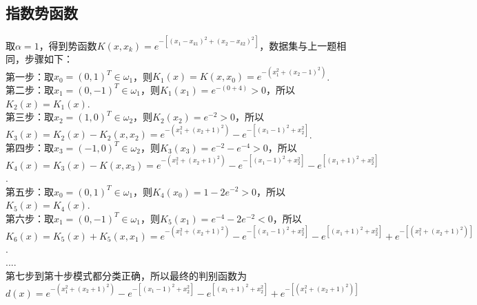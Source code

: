 \documentclass{article}
\begin{document}
\begin{CJK*}{UTF8}{gbsn}
    \section{指数势函数}
    取$\alpha=1$，得到势函数$K(x, x_{k})=e^{-[(x_{1}-x_{k1})^{2} + (x_{2}-x_{k2})^{2}]}$，数据集与上一题相同，步骤如下：\\
    第一步：取$x_{0}=(0, 1)^{T} \in \omega_{1}$，则$K_{1}(x) = K(x, x_{0}) = e^{-(x_{1}^{2}+(x_{2}-1)^2)}$. \\
    第二步：取$x_{1}=(0, -1)^{T} \in \omega_{1}$，则$K_{1}(x_{1})=e^{-(0+4)} > 0$，所以$K_{2}(x) = K_{1}(x)$. \\
    第三步：取$x_{2}=(1, 0)^{T} \in \omega_{2}$，则$K_{2}(x_{2})=e^{-2} > 0$，所以$K_{3}(x) = K_{2}(x) - K_{2}(x, x_{2}) = e^{-(x_{1}^{2}+(x_{2}+1)^{2})} - e^{-[(x_{1}-1)^{2}+x_{2}^{2}]}$. \\
    第四步：取$x_{3}=(-1, 0)^{T} \in \omega_{2}$，则$K_{3}(x_{3})=e^{-2}-e^{-4} > 0$，所以$K_{4}(x) = K_{3}(x)-K(x, x_{3}) = e^{-(x_{1}^{2}+(x_{2}+1)^{2})} - e^{-[(x_{1}-1)^{2}+x_{2}^{2}]} - e^{[(x_{1}+1)^{2}+x_{2}^{2}]}$. \\
    第五步：取$x_{0}=(0, 1)^{T} \in \omega_{1}$，则$K_{4}(x_{0}) = 1-2e^{-2} > 0$，所以$K_{5}(x) = K_{4}(x)$. \\
    第六步：取$x_{1}=(0, -1)^{T} \in \omega_{1}$，则$K_{5}(x_{1})= e^{-4}-2e^{-2} < 0$，所以$K_6(x) = K_{5}(x) + K_{5}(x, x_{1}) = e^{-(x_{1}^{2}+(x_{2}+1)^{2})} - e^{-[(x_{1}-1)^{2}+x_{2}^{2}]} - e^{[(x_{1}+1)^{2}+x_{2}^{2}]} + e^{-[(x_{1}^{2} + (x_{2}+1)^{2})]}$. \\
    .... \\
    第七步到第十步模式都分类正确，所以最终的判别函数为
    $$d(x)=e^{-(x_{1}^{2}+(x_{2}+1)^{2})} - e^{-[(x_{1}-1)^{2}+x_{2}^{2}]} - e^{[(x_{1}+1)^{2}+x_{2}^{2}]} + e^{-[(x_{1}^{2} + (x_{2}+1)^{2})]}$$
    

\end{CJK*}
\end{document}
